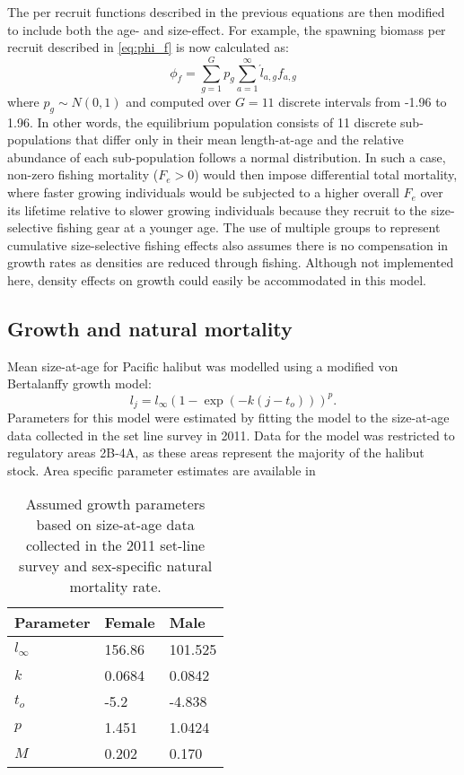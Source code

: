\documentclass[12pt,leqno]{article}
\begin{document}
The per recruit functions described in the previous equations are then modified to include both the age- and size-effect.  For example, the spawning biomass per recruit described in \eqref{eq:phi_f} is now calculated as:
\begin{equation}
	\phi_{f} =\sum_{g=1}^G p_g \sum_{a=1}^\infty \acute{l}_{a,g} f_{a,g}\label{eq:phi_fg}
\end{equation}
where $p_g \sim N(0,1)$ and computed over $G=11$ discrete intervals from -1.96 to 1.96.  In other words, the equilibrium population consists of 11 discrete sub-populations that differ only in their mean length-at-age and the relative abundance of each sub-population follows a normal distribution.  In such a case, non-zero fishing mortality  ($F_e>0$) would then impose differential total mortality, where faster growing individuals would be subjected to a higher overall $F_e$ over its lifetime relative to slower growing individuals because they recruit to the size-selective fishing gear at a younger age.  The use of multiple groups to represent cumulative size-selective fishing effects also assumes  there is no compensation in growth rates as densities are reduced through fishing. Although not implemented here, density effects on growth could easily be accommodated in this model.

\subsection*{Growth and natural mortality}
Mean size-at-age for Pacific halibut was modelled using a modified von Bertalanffy growth model:
\begin{equation}
	l_j = l_\infty (1 - \exp(-k(j-t_o)))^p.	
\end{equation}
Parameters for this model were estimated by fitting the model to the size-at-age data collected in the set line survey in 2011.  Data for the model was restricted to regulatory areas 2B-4A, as these areas represent the majority of the halibut stock. Area specific parameter estimates are available in \cite{martell2013:ohr}

\begin{table}
\begin{center}
	
	\caption{Assumed growth parameters based on size-at-age data collected in the 2011 set-line survey and sex-specific natural mortality rate.} \label{tab:Parameters}
	\begin{tabular}{lll}
	\hline
	 Parameter & Female  & Male\\
	 \hline
	 $l_\infty$ & 156.86 & 101.525\\
	 $k$   & 0.0684	& 0.0842\\
	 $t_o$ & -5.2  & -4.838\\
	 $p$ & 1.451 & 1.0424\\
	 $M$ & 0.202 & 0.170\\
	 \hline 
	\end{tabular}
\end{center}
\end{table}
\end{document}
